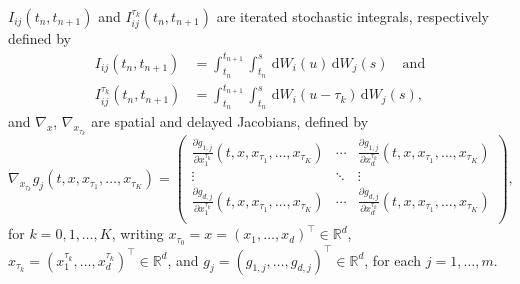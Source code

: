 \documentclass[onefignum]{siamart250211}
\begin{document}
$I_{ij}(t_n,t_{n+1})$ and $I_{ij}^{\tau_k}(t_n,t_{n+1})$ are iterated stochastic integrals, respectively defined by
\begin{align}
I_{ij}(t_n,t_{n+1})&=\int_{t_n}^{t_{n+1}}\int_{t_n}^s\,\mathrm{d}W_i(u)\,\mathrm{d}W_j(s)\quad\textrm{and}\label{IijandIijtauk}\\ I_{ij}^{\tau_k}(t_n,t_{n+1})&=\int_{t_n}^{t_{n+1}}\int_{t_n}^s\,\mathrm{d}W_i(u-\tau_k)\,\mathrm{d}W_j(s),\nonumber
\end{align}
and $\nabla_x$, $\nabla_{x_{\tau_k}}$ are spatial and delayed Jacobians, defined by
\[\nabla_{x_{\tau_k}}g_j(t,\!x,\!x_{\tau_1},\!\ldots,\!x_{\tau_K})=\left(
                          \begin{array}{ccc}
                            \frac{\partial g_{1,j}}{\partial x_1^{\tau_k}}(t,\!x,\!x_{\tau_1},\!\ldots,\!x_{\tau_K}) & \cdots & \frac{\partial g_{1,j}}{\partial x_d^{\tau_k}}(t,\!x,\!x_{\tau_1},\!\ldots,\!x_{\tau_K}) \\
                            \vdots & \ddots & \vdots \\
                            \frac{\partial g_{d,j}}{\partial x_1^{\tau_k}}(t,\!x,\!x_{\tau_1},\!\ldots,\!x_{\tau_K}) & \cdots & \frac{\partial g_{d,j}}{\partial x_d^{\tau_k}}(t,\!x,\!x_{\tau_1},\!\ldots,\!x_{\tau_K}) \\
                          \end{array}
                        \right),\]
for $k=0,1,\ldots,K$, writing $x_{\tau_0}=x=(x_1,\ldots,x_d)^\intercal\in\mathbb{R}^d$, $x_{\tau_k}=(x_1^{\tau_k},\ldots,x_d^{\tau_k})^\intercal\in\mathbb{R}^d$, and $g_j=(g_{1,j},\ldots,g_{d,j})^\intercal\in\mathbb{R}^d$, for each $j=1,\ldots,m$.
\end{document}
